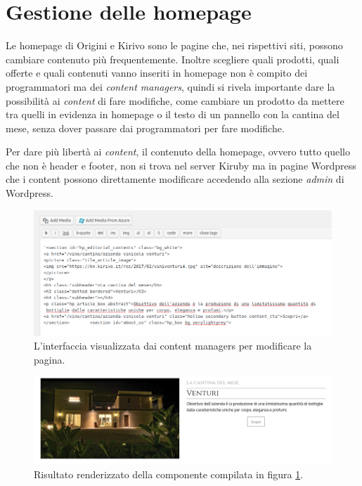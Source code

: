 \section{Gestione delle homepage} 	

Le homepage di Origini e Kirivo sono le pagine che, nei rispettivi siti, possono cambiare contenuto più 
frequentemente. Inoltre scegliere quali prodotti, quali offerte e quali contenuti 
vanno inseriti in homepage non è compito dei programmatori ma dei \emph{content managers},
quindi si rivela importante dare la possibilità ai \emph{content} di fare modifiche, come cambiare un prodotto da
mettere tra quelli in evidenza in homepage o il testo di un pannello con la cantina del mese, senza dover passare 
dai programmatori per fare modifiche.

Per dare più libertà ai \emph{content}, il contenuto della homepage, ovvero tutto quello che non è
header e footer, non si trova nel server Kiruby ma in pagine Wordpress che i content possono direttamente 
modificare accedendo alla sezione \emph{admin} di Wordpress.

\begin{figure}
  \includegraphics[width=\textwidth]{figure/whtml.png}
  \caption{L'interfaccia visualizzata dai content managers per modificare la pagina.}
  \label{fig:whtml}
\end{figure}

\begin{figure}
  \includegraphics[width=\textwidth]{figure/wrender.png}
  \caption{Risultato renderizzato della componente compilata in figura \ref{fig:whtml}.}
  \label{fig:wrender}
\end{figure}


